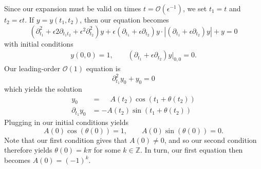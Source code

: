\documentclass[10pt,letterpaper]{report}
\newcommand{\Z}{\mathbb{Z}}
\newcommand{\abs}[1]{\left|{#1}\right|}
\newcommand{\Ord}[1]{\mathcal{O}\left({#1}\right)}
\begin{document}
\begin{enumerate}
Since our expansion must be valid on times $t = \Ord{\epsilon^{-1}}$, we set $t_1 = t$ and $t_2 = \epsilon t$. If $y = y(t_1, t_2)$, then our equation becomes
\[
\left(\partial_{t_1}^2 + \epsilon2\partial_{t_1t_2} + \epsilon^2 \partial^2_{t_2}\right)y + \epsilon\left(\partial_{t_1} + \epsilon\partial_{t_2}\right)y\cdot \abs{\left(\partial_{t_1} + \epsilon\partial_{t_2}\right)y} + y = 0
\]
with initial conditions
\begin{align*}
    y(0, 0) = 1, \qquad \left(\partial_{t_1} + \epsilon\partial_{t_2}\right)y\big\vert_{0,0} = 0.
\end{align*}
Our leading-order $\Ord{1}$ equation is
\[
\partial_{t_1}^2 y_0 + y_0 = 0
\]
which yields the solution
\begin{align*}
    y_0 &= \phantom{-}A(t_2)\cos(t_1 + \theta(t_2)) \\
    \partial_{t_1} y_0 &= -A(t_2)\sin(t_1 + \theta(t_2))
\end{align*}
Plugging in our initial conditions yields
\[
A(0)\cos(\theta(0)) = 1, \qquad A(0)\sin(\theta(0)) = 0.
\]
Note that our first condition gives that $A(0) \ne 0$, and so our second condition therefore yields $\theta(0) = k\pi$ for some $k \in \Z$. In turn, our first equation then becomes $A(0) = (-1)^k$.


\end{enumerate}
\end{document}
